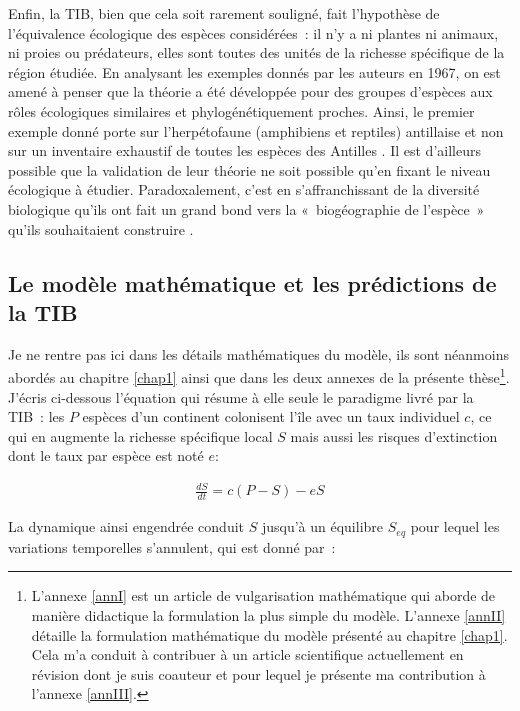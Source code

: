Enfin, la TIB, bien que cela soit rarement souligné, fait l'hypothèse de
l'équivalence écologique des espèces considérées~: il n'y a ni plantes
ni animaux, ni proies ou prédateurs, elles sont toutes des unités de la
richesse spécifique de la région étudiée. En analysant les exemples
donnés par les auteurs en 1967, on est amené à penser que la théorie a
été développée pour des groupes d'espèces aux rôles écologiques
similaires et phylogénétiquement proches. Ainsi, le premier exemple
donné porte sur l'herpétofaune (amphibiens et reptiles) antillaise et
non sur un inventaire exhaustif de toutes les espèces des Antilles
\citep{MacArthur1967}. Il est d'ailleurs possible que la validation de
leur théorie ne soit possible qu'en fixant le niveau écologique à
étudier. Paradoxalement, c'est en s'affranchissant de la diversité
biologique qu'ils ont fait un grand bond vers la «~biogéographie de
l'espèce~» qu'ils souhaitaient construire \citep[ p.183]{MacArthur1967}.

\subsection*{Le modèle mathématique et les prédictions de la
TIB}\label{le-moduxe8le-mathuxe9matique-et-les-pruxe9dictions-de-la-tib}

Je ne rentre pas ici dans les détails mathématiques du modèle, ils sont
néanmoins abordés au chapitre \ref{chap1} ainsi que dans les deux
annexes de la présente thèse\footnote{L'annexe \ref{annI} est un article
  de vulgarisation mathématique qui aborde de manière didactique la
  formulation la plus simple du modèle. L'annexe \ref{annII} détaille la
  formulation mathématique du modèle présenté au chapitre \ref{chap1}.
  Cela m'a conduit à contribuer à un article scientifique actuellement
  en révision dont je suis coauteur et pour lequel je présente ma
  contribution à l'annexe \ref{annIII}.}. J'écris ci-dessous l'équation
qui résume à elle seule le paradigme livré par la TIB~: les \(P\)
espèces d'un continent colonisent l'île avec un taux individuel \(c\),
ce qui en augmente la richesse spécifique local \(S\) mais aussi les
risques d'extinction dont le taux par espèce est noté \(e\):

\begin{eqnarray}
\label{eqMW}
\frac{dS}{dt} = c(P-S)-eS
\end{eqnarray}

La dynamique ainsi engendrée conduit \(S\) jusqu'à un équilibre
\(S_{eq}\) pour lequel les variations temporelles s'annulent, qui est
donné par~:

